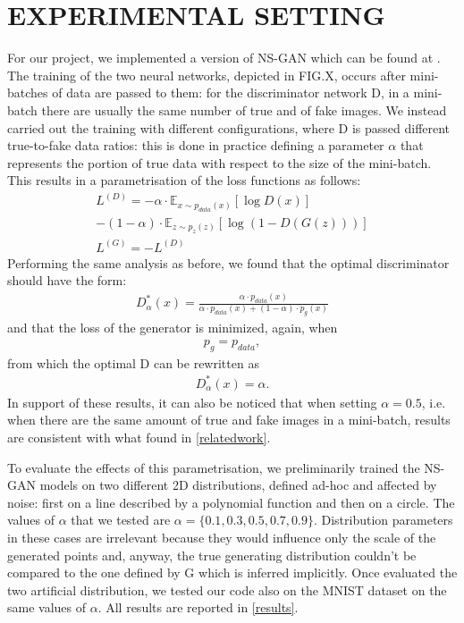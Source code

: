 \section{EXPERIMENTAL SETTING} \label{expsetting}

For our project, we implemented a version of NS-GAN which can be found at \cite{bibid}. The training of the two neural networks, depicted in FIG.X, occurs after mini-batches of data are passed to them: for the discriminator network D, in a mini-batch there are usually the same number of true and of fake images. We instead carried out the training with different configurations, where D is passed different true-to-fake data ratios: this is done in practice defining a parameter $\alpha$ that represents the portion of true data with respect to the size of the mini-batch. This results in a parametrisation of the loss functions as follows:
\begin{align*}
	L^{(D)}=-\alpha\cdot\mathbb{E}_{x \sim p_{data}(x)}[\log D(x)] \\
	- (1-\alpha)\cdot\mathbb{E}_{z \sim p_{z}(z)}[\log (1-D(G(z)))]\\
	L^{(G)}=-L^{(D)}
\end{align*}
Performing the same analysis as before, we found that the optimal discriminator should have the form:
\begin{align*}
	D_{\alpha}^*(x) = \frac{\alpha \cdot p_{data}(x)}{\alpha \cdot p_{data}(x) + (1-\alpha)\cdot p_g(x)}
\end{align*}
and that the loss of the generator is minimized, again, when
\begin{align*}
	p_g = p_{data},
\end{align*}
from which the optimal D can be rewritten as
\begin{align*}
	D_{\alpha}^*(x) = \alpha.
\end{align*}
In support of these results, it can also be noticed that when setting $\alpha = 0.5$, i.e. when there are the same amount of true and fake images in a mini-batch, results are consistent with what found in \ref{relatedwork}.

To evaluate the effects of this parametrisation, we preliminarily trained the NS-GAN models on two different 2D distributions, defined ad-hoc and affected by noise: first on a line described by a polynomial function and then on a circle.
The values of $\alpha$ that we tested are $\alpha = \{0.1,0.3,0.5,0.7,0.9\}$.
Distribution parameters in these cases are irrelevant because they would influence only the scale of the generated points and, anyway, the true generating distribution couldn't be compared to the one defined by G which is inferred implicitly.
Once evaluated the two artificial distribution, we tested our code also on the MNIST dataset on the same values of $\alpha$.
All results are reported in \ref{results}.